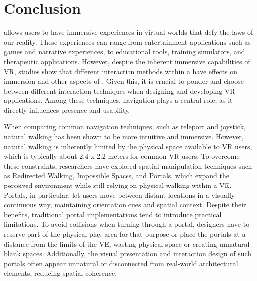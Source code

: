 
%

\chapter{Conclusion}
\label{cha:conclusion}

 allows users to have immersive experiences in virtual worlds that defy the laws of our reality. 
These experiences can range from entertainment applications such as games and narrative experiences, to educational tools, training simulators, 
and therapeutic applications.
However, despite the inherent immersive capabilities of \gls{VR}, studies show that different interaction methods within a  have 
effects on immersion and other aspects of . Given this, it is crucial to ponder and choose between different interaction techniques 
when designing and developing \gls{VR} applications. Among these techniques, navigation plays a central role, 
as it directly influences presence and usability.

When comparing common navigation techniques, such as teleport and joystick, natural walking has been
shown to be more intuitive and immersive. However, natural walking is inherently limited by the physical space
available to \gls{VR} users, which is typically about 2.4 x 2.2 meters for common \gls{VR} users.
To overcome these constraints, researchers have explored spatial manipulation techniques such as Redirected Walking, Impossible Spaces, 
and Portals, which expand the perceived environment while still relying on physical walking within a \gls{VE}.
Portals, in particular, let users move between distant locations in a visually continuous way, maintaining orientation cues and
spatial context. Despite their benefits, traditional portal implementations tend to
introduce practical limitations. To avoid collisions when turning through a portal, designers have to reserve part of the physical play
area for that purpose or place the portals at a distance from the limits of the \gls{VE}, wasting physical space or
creating unnatural blank spaces. Additionally, the visual presentation and interaction design of such portals often appear unnatural
or disconnected from real-world architectural elements, reducing spatial coherence.

